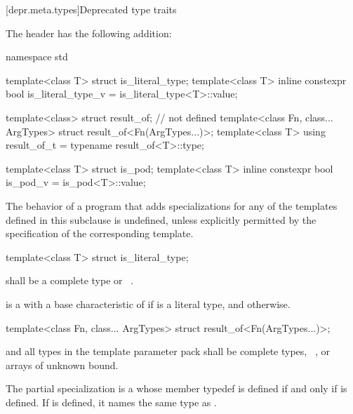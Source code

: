 [depr.meta.types]{Deprecated type traits}

\pnum
The header
%
 has the following addition:

%
\begin{codeblock}
namespace std {
  template<class T> struct is_literal_type;
  template<class T> inline constexpr bool is_literal_type_v = is_literal_type<T>::value;

  template<class> struct result_of;    // not defined
  template<class Fn, class... ArgTypes> struct result_of<Fn(ArgTypes...)>;
  template<class T> using result_of_t = typename result_of<T>::type;

  template<class T> struct is_pod;
  template<class T> inline constexpr bool is_pod_v = is_pod<T>::value;
}
\end{codeblock}

\pnum
The behavior of a program that adds specializations for
any of the templates defined in this subclause is undefined,
unless explicitly permitted by the specification of the corresponding template.

\begin{itemdecl}
template<class T> struct is_literal_type;
\end{itemdecl}

\begin{itemdescr}
\pnum
\requires
{} shall be a complete type or \cv{}~.

\pnum
{} is a 
with a base characteristic of 
if  is a literal type, and
 otherwise.
\end{itemdescr}

\begin{itemdecl}
template<class Fn, class... ArgTypes> struct result_of<Fn(ArgTypes...)>;
\end{itemdecl}

\begin{itemdescr}
\pnum
\requires
{} and all types in the template parameter pack  shall be complete types,
\cv{}~, or arrays of unknown bound.

\pnum
The partial specialization  is a
 whose member typedef  is defined
if and only if  is defined.
If  is defined, it names the same type as .
\end{itemdescr}

